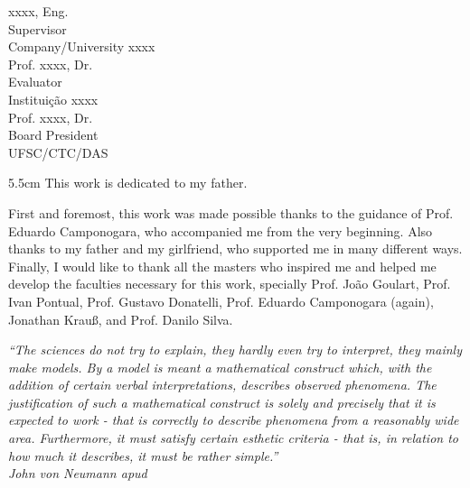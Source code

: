 \begin{folhadeaprovacao}
	\vspace*{2\baselineskip}
	xxxx, Eng.\\
	Supervisor \\
	Company/University xxxx\\
	
	\vspace*{2\baselineskip}
	Prof. xxxx, Dr.\\
	Evaluator \\
	Instituição xxxx\\
	
	\vspace*{2\baselineskip}
	Prof. xxxx, Dr.\\
	Board President \\
	UFSC/CTC/DAS
\end{folhadeaprovacao}

\begin{dedicatoria}
	\vspace*{\fill}
	\noindent
	\begin{adjustwidth*}{}{5.5cm} 
		\raggedleft       
		This work is dedicated to my father.
	\end{adjustwidth*}
\end{dedicatoria}

\begin{agradecimentos}
    First and foremost, this work was made possible thanks to the guidance of Prof. Eduardo Camponogara, who accompanied me from the very beginning.
    Also thanks to my father and my girlfriend, who supported me in many different ways.
    Finally, I would like to thank all the masters who inspired me and helped me develop the faculties necessary for this work, specially Prof. João Goulart, Prof. Ivan Pontual, Prof. Gustavo Donatelli, Prof. Eduardo Camponogara (again), Jonathan Krauß, and Prof. Danilo Silva.
\end{agradecimentos}

\begin{epigrafe}
	\vspace*{\fill}
	\begin{flushright}
		\textit{``The sciences do not try to explain, they hardly even try to interpret, they mainly make models. By a model is meant a mathematical construct which, with the addition of certain verbal interpretations, describes observed phenomena. The justification of such a mathematical construct is solely and precisely that it is expected to work - that is correctly to describe phenomena from a reasonably wide area. Furthermore, it must satisfy certain esthetic criteria - that is, in relation to how much it describes, it must be rather simple.''\\
		\emph{John von Neumann} apud \emph{\textcite{leary_unity_1955}}}
	\end{flushright}
\end{epigrafe}

